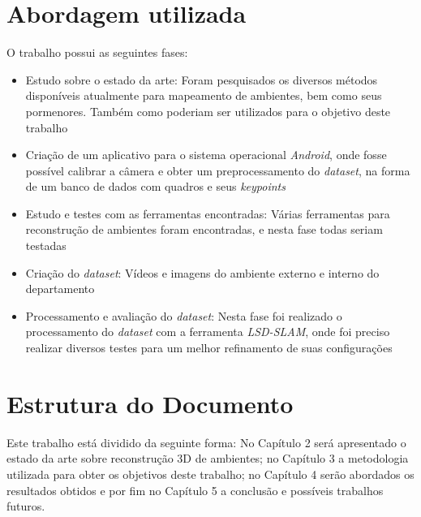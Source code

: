 \section{Abordagem utilizada}

O trabalho possui as seguintes fases:
\begin{itemize}
\item{Estudo sobre o estado da arte: Foram pesquisados os diversos métodos disponíveis atualmente para mapeamento de ambientes, bem como seus pormenores. Também como  poderiam ser utilizados para o objetivo deste trabalho}
\item{Criação de um aplicativo para o sistema operacional \textit{Android}, onde fosse possível calibrar a câmera e obter um preprocessamento do \textit{dataset}, na forma de um banco de dados com quadros e seus \textit{keypoints}}
\item{Estudo e testes com as ferramentas encontradas: Várias ferramentas para reconstrução de ambientes foram encontradas, e nesta fase todas seriam testadas}
\item{Criação do \textit{dataset}: Vídeos e imagens do ambiente externo e interno do departamento}
\item{Processamento e avaliação do \textit{dataset}: Nesta fase foi realizado o processamento do \textit{dataset} com a ferramenta \textit{LSD-SLAM}, onde foi preciso realizar diversos testes para um melhor refinamento de suas configurações}
\end{itemize}


\section{Estrutura do Documento}


Este trabalho está dividido da seguinte forma: No Capítulo 2 será apresentado o estado da arte sobre reconstrução 3D de ambientes; no Capítulo 3 a metodologia utilizada para obter os objetivos deste trabalho; no Capítulo 4 serão abordados os resultados obtidos e por fim no Capítulo 5 a conclusão e possíveis trabalhos futuros.

